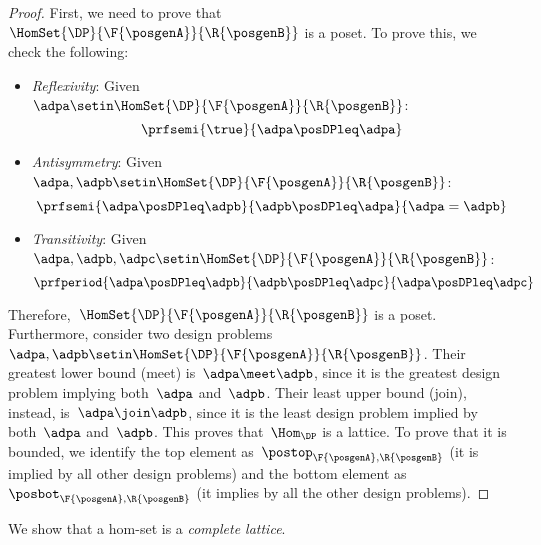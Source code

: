 \begin{proof}
    First, we need to prove that~$\HomSet{\DP}{\F{\posgenA}}{\R{\posgenB}}$ is a poset.
    To prove this, we check the following:
    \begin{itemize}
        \item \emph{Reflexivity}: Given~$\adpa\setin \HomSet{\DP}{\F{\posgenA}}{\R{\posgenB}}$:
              \begin{equation}
                  \prfsemi{
                      \true
                  }{
                      \adpa\posDPleq \adpa
                  }
              \end{equation}
        \item \emph{Antisymmetry}: Given~$\adpa,\adpb\setin \HomSet{\DP}{\F{\posgenA}}{\R{\posgenB}}$:
              \begin{equation}
                  \prfsemi{
                      \adpa\posDPleq \adpb
                  }{
                      \adpb\posDPleq \adpa
                  }{
                      \adpa=\adpb
                  }
              \end{equation}
        \item \emph{Transitivity}: Given~$\adpa,\adpb,\adpc\setin \HomSet{\DP}{\F{\posgenA}}{\R{\posgenB}}$:
              \begin{equation}
                  \prfperiod{
                      \adpa\posDPleq \adpb
                  }{
                      \adpb\posDPleq \adpc
                  }{
                      \adpa \posDPleq \adpc
                  }
              \end{equation}
    \end{itemize}
    Therefore,~$\HomSet{\DP}{\F{\posgenA}}{\R{\posgenB}}$ is a poset.
    Furthermore, consider two design problems~$\adpa,\adpb\setin \HomSet{\DP}{\F{\posgenA}}{\R{\posgenB}}$.
    Their greatest lower bound (meet) is~$\adpa\meet\adpb$, since it is the greatest design problem implying both~$\adpa$ and~$\adpb$.
    Their least upper bound (join), instead, is~$\adpa\join \adpb$, since it is the least design problem implied by both~$\adpa$ and~$\adpb$.
    This proves that~$\Hom_\DP$ is a lattice.
    To prove that it is bounded, we identify the top element as~$\postop_{\F{\posgenA},\R{\posgenB}}$ (it is implied by all other design problems) and the bottom element as~$\posbot_{\F{\posgenA},\R{\posgenB}}$ (it implies by all the other design problems).
\end{proof}

We show that a \DP hom-set is a \emph{complete lattice}.

